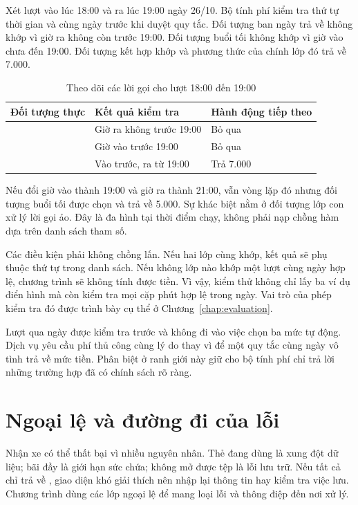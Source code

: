 
Xét lượt vào lúc 18:00 và ra lúc 19:00 ngày 26/10. Bộ tính phí kiểm tra thứ tự thời gian và cùng ngày trước khi duyệt quy tắc. Đối tượng ban ngày trả về không khớp vì giờ ra không còn trước 19:00. Đối tượng buổi tối không khớp vì giờ vào chưa đến 19:00. Đối tượng kết hợp khớp và phương thức  của chính lớp đó trả về 7.000.

\begin{table}[H]
\centering\small
\caption{Theo dõi các lời gọi cho lượt 18:00 đến 19:00}
\label{tab:dispatch-trace}
\begin{tabularx}{\textwidth}{l Y l}
\toprule
Đối tượng thực & Kết quả kiểm tra & Hành động tiếp theo\\
\midrule
{} & Giờ ra không trước 19:00 & Bỏ qua\\
 & Giờ vào trước 19:00 & Bỏ qua\\
 & Vào trước, ra từ 19:00 & Trả 7.000\\
\bottomrule
\end{tabularx}
\end{table}

Nếu đổi giờ vào thành 19:00 và giờ ra thành 21:00, vẫn vòng lặp đó nhưng đối tượng buổi tối được chọn và trả về 5.000. Sự khác biệt nằm ở đối tượng lớp con xử lý lời gọi ảo. Đây là đa hình tại thời điểm chạy, không phải nạp chồng hàm dựa trên danh sách tham số.

Các điều kiện phải không chồng lấn. Nếu hai lớp cùng khớp, kết quả sẽ phụ thuộc thứ tự trong danh sách. Nếu không lớp nào khớp một lượt cùng ngày hợp lệ, chương trình sẽ không tính được tiền. Vì vậy, kiểm thử không chỉ lấy ba ví dụ điển hình mà còn kiểm tra mọi cặp phút hợp lệ trong ngày. Vai trò của phép kiểm tra đó được trình bày cụ thể ở Chương~\ref{chap:evaluation}.

Lượt qua ngày được kiểm tra trước và không đi vào việc chọn ba mức tự động. Dịch vụ yêu cầu phí thủ công cùng lý do thay vì để một quy tắc cùng ngày vô tình trả về mức tiền. Phân biệt ở ranh giới này giữ cho bộ tính phí chỉ trả lời những trường hợp đã có chính sách rõ ràng.

\section{Ngoại lệ và đường đi của lỗi}
Nhận xe có thể thất bại vì nhiều nguyên nhân. Thẻ đang dùng là xung đột dữ liệu; bãi đầy là giới hạn sức chứa; không mở được tệp là lỗi lưu trữ. Nếu tất cả chỉ trả về , giao diện khó giải thích nên nhập lại thông tin hay kiểm tra việc lưu. Chương trình dùng các lớp ngoại lệ để mang loại lỗi và thông điệp đến nơi xử lý.

